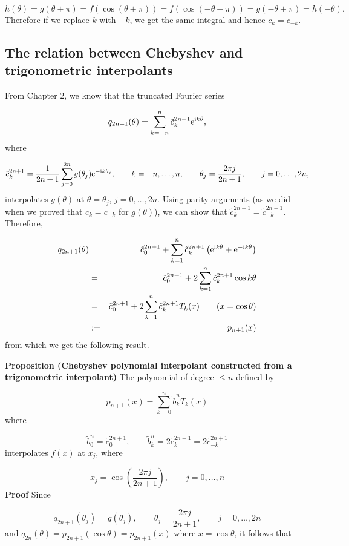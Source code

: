\documentclass[12pt,a4paper]{article}
\begin{document}
\[
h(\theta) = g(\theta + \pi) = f(\cos(\theta+\pi)) = f(\cos(-\theta+\pi)) = g(-\theta +\pi) = h(-\theta). 
\]
Therefore if we replace $k$ with $-k$, we get the same integral and hence $c_{k} = c_{-k}$.

\subsection{The relation between Chebyshev and trigonometric interpolants}
From Chapter 2, we know that the truncated Fourier series

\[
q_{2n+1}(\theta) = \sum_{k=-n}^{n} \tilde{c}_k^{2n+1} {\rm e}^{{\rm i}k\theta},
\]
where

\[
\tilde{c}_k^{2n+1} = \frac{1}{2n+1}\sum_{j = 0}^{2n} g(\theta_j) {\rm e}^{-{\rm i}k\theta_j}, \qquad k = -n, \ldots, n, \qquad \theta_{j} = \frac{2\pi j}{2n+1},\qquad j = 0, \ldots, 2n,
\]
interpolates $g(\theta)$ at $\theta = \theta_j$, $j = 0, \ldots, 2n$.  Using parity arguments (as we did when we proved that $c_{k} = c_{-k}$ for $g(\theta)$), we can show that $\tilde{c}_k^{2n+1} = \tilde{c}_{-k}^{2n+1}$. Therefore,


\begin{eqnarray*}
q_{2n+1}(\theta) &=& \tilde{c}_0^{2n+1}+ \sum_{k=1}^{n} \tilde{c}_k^{2n+1}\left( {\rm e}^{{\rm i}k\theta} + {\rm e}^{-{\rm i}k\theta} \right) \\
&=&  \tilde{c}_0^{2n+1} + 2\sum_{k=1}^{n} \tilde{c}_k^{2n+1}\cos k\theta \\
&=&  \tilde{c}_0^{2n+1} + 2\sum_{k=1}^{n} \tilde{c}_k^{2n+1} T_k(x) \qquad (x = \cos\theta) \\
&:=& p_{n+1}(x)
\end{eqnarray*}
from which we get the following result.

\textbf{Proposition (Chebyshev polynomial interpolant constructed from a trigonometric interpolant)} The polynomial of degree $\leq n$ defined by 

\[
p_{n+1}(x) = \sum_{k=0}^{n} \tilde{b}_k^nT_k(x) 
\]
where

\[
\tilde{b}_0^n = \tilde{c}_0^{2n+1}, \qquad \tilde{b}_k^n = 2\tilde{c}_k^{2n+1}  = 2\tilde{c}_{-k}^{2n+1}
\]
interpolates $f(x)$  at $x_{j}$, where

\[
x_j = \cos\left( \frac{2\pi j}{2n + 1}  \right), \qquad j = 0, \ldots, n
\]
\textbf{Proof} Since 

\[
q_{2n+1}(\theta_j) = g(\theta_j), \qquad \theta_j = \frac{2\pi j}{2n+ 1}, \qquad j = 0, \ldots, 2n
\]
and $q_{2n}(\theta) = p_{2n+1}(\cos \theta) = p_{2n+1}(x)$ where $x = \cos\theta$, it follows that
\end{document}
